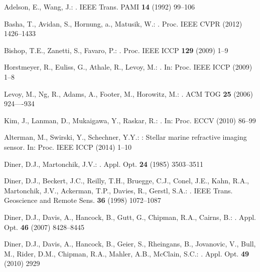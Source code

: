 \documentclass[runningheads]{llncs}
\begin{document}

%
\begin{thebibliography}{10}

Adelson, E., Wang, J.:
.
\newblock IEEE Trans. PAMI \textbf{14} (1992)  99--106

Basha, T., Avidan, S., Hornung, a., Matusik, W.:
.
\newblock Proc. IEEE CVPR (2012)  1426--1433

Bishop, T.E., Zanetti, S., Favaro, P.:
.
\newblock Proc. IEEE ICCP \textbf{129} (2009)  1--9

Horstmeyer, R., Euliss, G., Athale, R., Levoy, M.:
.
\newblock In: Proc. IEEE ICCP  (2009)  1--8

Levoy, M., Ng, R., Adams, A., Footer, M., Horowitz, M.:
.
\newblock ACM TOG \textbf{25} (2006)  924----934

Kim, J., Lanman, D., Mukaigawa, Y., Raskar, R.:
.
\newblock In: Proc. ECCV  (2010)  86--99

Alterman, M., Swirski, Y., Schechner, Y.Y.:
: Stellar marine refractive imaging sensor.
\newblock In: Proc. IEEE ICCP  (2014)  1--10

Diner, D.J., Martonchik, J.V.:
.
\newblock Appl. Opt. \textbf{24} (1985)  3503--3511

Diner, D.J., Beckert, J.C., Reilly, T.H., Bruegge, C.J., Conel, J.E., Kahn,
  R.A., Martonchik, J.V., Ackerman, T.P., Davies, R., Gerstl, S.A.:
.
\newblock IEEE Trans. Geoscience and Remote Sens. \textbf{36} (1998)
  1072--1087

Diner, D.J., Davis, A., Hancock, B., Gutt, G., Chipman, R.A., Cairns, B.:
.
\newblock Appl. Opt. \textbf{46} (2007)  8428--8445

Diner, D.J., Davis, A., Hancock, B., Geier, S., Rheingans, B., Jovanovic, V.,
  Bull, M., Rider, D.M., Chipman, R.A., Mahler, A.B., McClain, S.C.:
.
\newblock Appl. Opt. \textbf{49} (2010)  2929


\end{thebibliography}
\end{document}
